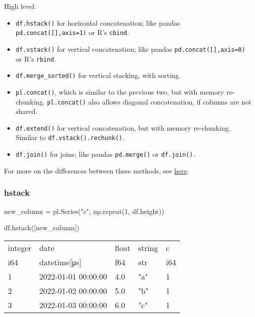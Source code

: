 \documentclass[
  letterpaper,
  DIV=11,
  numbers=noendperiod]{scrartcl}
\newenvironment{Shaded}{\begin{snugshade}}{\end{snugshade}}
\newcommand{\DecValTok}[1]{\textcolor[rgb]{0.68,0.00,0.00}{#1}}
\newcommand{\NormalTok}[1]{\textcolor[rgb]{0.00,0.23,0.31}{#1}}
\newcommand{\OperatorTok}[1]{\textcolor[rgb]{0.37,0.37,0.37}{#1}}
\newcommand{\StringTok}[1]{\textcolor[rgb]{0.13,0.47,0.30}{#1}}
\providecommand{\tightlist}{%
  \setlength{\itemsep}{0pt}\setlength{\parskip}{0pt}}\usepackage{longtable,booktabs,array}
\begin{document}
High level:

\begin{itemize}
\tightlist
\item
  \texttt{df.hstack()} for horizontal concatenation; like pandas
  \texttt{pd.concat({[}{]},axis=1)} or R's \texttt{cbind}.
\item
  \texttt{df.vstack()} for vertical concatenation; like pandas
  \texttt{pd.concat({[}{]},axis=0)} or R's \texttt{rbind}.
\item
  \texttt{df.merge\_sorted()} for vertical stacking, with sorting.
\item
  \texttt{pl.concat()}, which is similar to the previous two, but with
  memory re-chunking. \texttt{pl.concat()} also allows diagonal
  concatenation, if columns are not shared.
\item
  \texttt{df.extend()} for vertical concatenation, but with memory
  re-chunking. Similar to \texttt{df.vstack().rechunk()}.
\item
  \texttt{df.join()} for joins; like pandas \texttt{pd.merge()} or
  \texttt{df.join()}.
\end{itemize}

For more on the differences between these methods, see
\href{https://www.rhosignal.com/posts/polars-extend-vstack/}{here}.

\hypertarget{hstack}{%
\subsubsection{hstack}\label{hstack}}

\begin{Shaded}
\begin{Highlighting}[]
\NormalTok{new\_column }\OperatorTok{=}\NormalTok{ pl.Series(}\StringTok{"c"}\NormalTok{, np.repeat(}\DecValTok{1}\NormalTok{, df.height))}

\NormalTok{df.hstack([new\_column])}
\end{Highlighting}
\end{Shaded}

\begin{longtable}[]{@{}lllll@{}}
\toprule()
integer & date & float & string & c \\
i64 & datetime{[}μs{]} & f64 & str & i64 \\
\midrule()
\endhead
1 & 2022-01-01 00:00:00 & 4.0 & "a" & 1 \\
2 & 2022-01-02 00:00:00 & 5.0 & "b" & 1 \\
3 & 2022-01-03 00:00:00 & 6.0 & "c" & 1 \\
\bottomrule()
\end{longtable}
\end{document}
